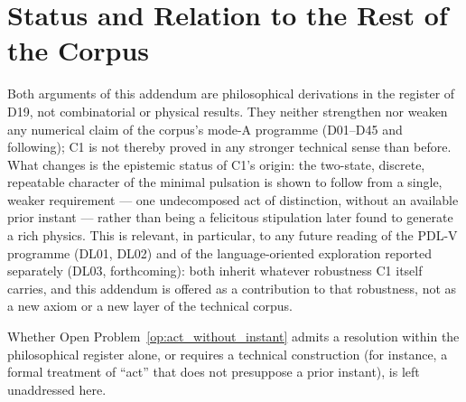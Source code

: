 \documentclass[11pt,a4paper]{article}
\begin{document}
\section{Status and Relation to the Rest of the Corpus}
\label{sec:status}

Both arguments of this addendum are philosophical derivations in the register of D19, not combinatorial or physical results. They neither strengthen nor weaken any numerical claim of the corpus's mode-A programme (D01--D45 and following); C1 is not thereby proved in any stronger technical sense than before. What changes is the epistemic status of C1's origin: the two-state, discrete, repeatable character of the minimal pulsation is shown to follow from a single, weaker requirement --- one undecomposed act of distinction, without an available prior instant --- rather than being a felicitous stipulation later found to generate a rich physics. This is relevant, in particular, to any future reading of the PDL-V programme (DL01, DL02) and of the language-oriented exploration reported separately (DL03, forthcoming): both inherit whatever robustness C1 itself carries, and this addendum is offered as a contribution to that robustness, not as a new axiom or a new layer of the technical corpus.

Whether Open Problem~\ref{op:act_without_instant} admits a resolution within the philosophical register alone, or requires a technical construction (for instance, a formal treatment of ``act'' that does not presuppose a prior instant), is left unaddressed here.

\clearpage



\end{document}
